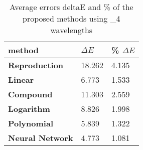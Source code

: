 \begin{table}[H]
  \caption{\label{tab:Average errors of the proposed methods}Average errors deltaE and \% of the proposed methods using _4 wavelengths}
      \begin{tabularx}{\textwidth}{C C C}
    \toprule
      \textbf{method} & \textbf{$\Delta E$} & \textbf{\% $\Delta E$} \\ \midrule
      \textbf{Reproduction} & 18.262 & 4.135\\ 
      \textbf{Linear} & 6.773 & 1.533\\ 
      \textbf{Compound} & 11.303 & 2.559\\ 
      \textbf{Logarithm} & 8.826 & 1.998\\ 
      \textbf{Polynomial} & 5.839 & 1.322\\ 
      \textbf{Neural Network} & 4.773 & 1.081\\ 
    \bottomrule
    \end{tabularx}
\end{table}

